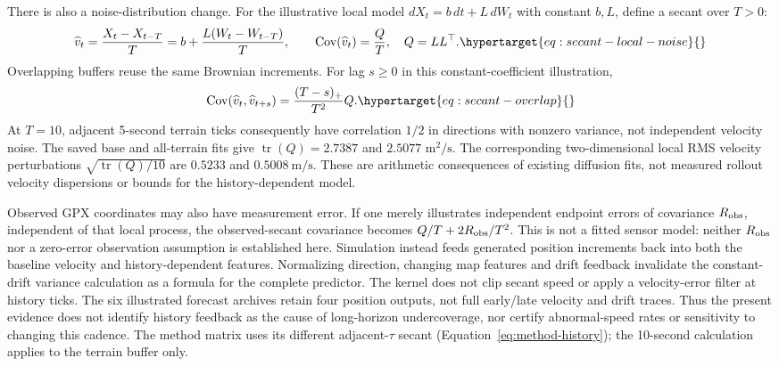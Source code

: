 There is also a noise-distribution change. For the illustrative local model
\(dX_t=b\,dt+L\,dW_t\) with constant \(b,L\), define a secant over \(T>0\):
\begin{equation}
 \widehat v_t=\frac{X_t-X_{t-T}}{T}
       =b+\frac{L(W_t-W_{t-T})}{T},\qquad
 \operatorname{Cov}(\widehat v_t)=\frac{Q}{T},
 \quad Q=LL^\top .
 \label{eq:secant-local-noise}\hypertarget{eq:secant-local-noise}{}
\end{equation}
Overlapping buffers reuse the same Brownian increments. For lag \(s\ge0\)
in this constant-coefficient illustration,
\begin{equation}
 \operatorname{Cov}(\widehat v_t,\widehat v_{t+s})
       =\frac{(T-s)_+}{T^2}Q .
 \label{eq:secant-overlap}\hypertarget{eq:secant-overlap}{}
\end{equation}
At \(T=10\), adjacent 5-second terrain ticks consequently have correlation
\(1/2\) in directions with nonzero variance, not independent velocity noise. The saved base and
all-terrain fits give \(\operatorname{tr}(Q)=2.7387\) and \(2.5077\)
\(\mathrm{m^2/s}\). The corresponding two-dimensional local RMS velocity
perturbations \(\sqrt{\operatorname{tr}(Q)/10}\) are \(0.5233\) and
\(0.5008\ \mathrm{m/s}\). These are arithmetic consequences of existing
diffusion fits, not measured rollout velocity dispersions or bounds for
the history-dependent model.

Observed GPX coordinates may also have measurement error. If one merely
illustrates independent endpoint errors of covariance \(R_{\rm obs}\),
independent of that local process, the observed-secant covariance becomes
\(Q/T+2R_{\rm obs}/T^2\). This is not a fitted sensor model: neither
\(R_{\rm obs}\) nor a zero-error observation assumption is established here.
Simulation instead feeds generated position increments back into both the
baseline velocity and history-dependent features. Normalizing direction,
changing map features and drift feedback invalidate the constant-drift
variance calculation as a formula for the complete predictor. The kernel
does not clip secant speed or apply a velocity-error filter at history ticks.
The six illustrated forecast archives retain four position outputs, not
full early/late velocity and drift traces. Thus the present evidence does
not identify history feedback as the cause of long-horizon undercoverage,
nor certify abnormal-speed rates or sensitivity to changing this cadence.
The method matrix uses its different adjacent-\(\tau\) secant
(Equation~\eqref{eq:method-history}); the 10-second calculation applies
to the terrain buffer only.


